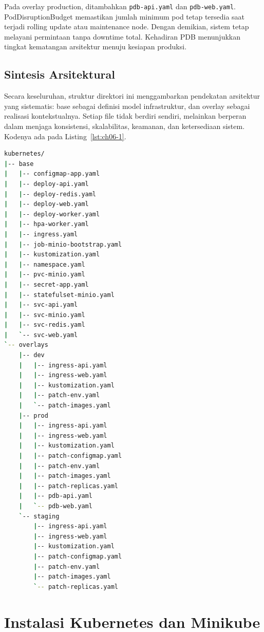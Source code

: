 Pada overlay production, ditambahkan \texttt{pdb-api.yaml} dan \texttt{pdb-web.yaml}. PodDisruptionBudget memastikan jumlah minimum pod tetap tersedia saat terjadi rolling update atau maintenance node. Dengan demikian, sistem tetap melayani permintaan tanpa downtime total. Kehadiran PDB menunjukkan tingkat kematangan arsitektur menuju kesiapan produksi.

\subsection*{Sintesis Arsitektural}

Secara keseluruhan, struktur direktori ini menggambarkan pendekatan arsitektur yang sistematis: base sebagai definisi model infrastruktur, dan overlay sebagai realisasi kontekstualnya. Setiap file tidak berdiri sendiri, melainkan berperan dalam menjaga konsistensi, skalabilitas, keamanan, dan ketersediaan sistem. Kodenya ada pada Listing~\ref{lst:ch06-1}.


\begin{lstlisting}[language=bash, caption={Potongan kode pada Sintesis Arsitektural}, label={lst:ch06-1}]
kubernetes/
|-- base
|   |-- configmap-app.yaml
|   |-- deploy-api.yaml
|   |-- deploy-redis.yaml
|   |-- deploy-web.yaml
|   |-- deploy-worker.yaml
|   |-- hpa-worker.yaml
|   |-- ingress.yaml
|   |-- job-minio-bootstrap.yaml
|   |-- kustomization.yaml
|   |-- namespace.yaml
|   |-- pvc-minio.yaml
|   |-- secret-app.yaml
|   |-- statefulset-minio.yaml
|   |-- svc-api.yaml
|   |-- svc-minio.yaml
|   |-- svc-redis.yaml
|   `-- svc-web.yaml
`-- overlays
    |-- dev
    |   |-- ingress-api.yaml
    |   |-- ingress-web.yaml
    |   |-- kustomization.yaml
    |   |-- patch-env.yaml
    |   `-- patch-images.yaml
    |-- prod
    |   |-- ingress-api.yaml
    |   |-- ingress-web.yaml
    |   |-- kustomization.yaml
    |   |-- patch-configmap.yaml
    |   |-- patch-env.yaml
    |   |-- patch-images.yaml
    |   |-- patch-replicas.yaml
    |   |-- pdb-api.yaml
    |   `-- pdb-web.yaml
    `-- staging
        |-- ingress-api.yaml
        |-- ingress-web.yaml
        |-- kustomization.yaml
        |-- patch-configmap.yaml
        |-- patch-env.yaml
        |-- patch-images.yaml
        `-- patch-replicas.yaml
\end{lstlisting}

\section{Instalasi Kubernetes dan Minikube}

